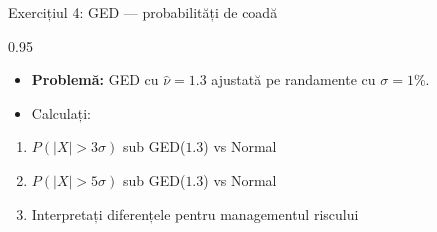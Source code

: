 \documentclass[9pt, aspectratio=169, t]{beamer}
\begin{document}
\begin{frame}{Exercițiul 4: GED --- probabilități de coadă}
    \begin{cminipage}{0.95\textwidth}
    \begin{itemize}\setlength{\itemsep}{0pt}
        \item \textbf{Problemă:} GED cu $\hat{\nu} = 1.3$ ajustată pe randamente cu $\sigma = 1\%$.
        \item Calculați:
    \end{itemize}
    \begin{enumerate}\setlength{\itemsep}{0pt}
        \item $P(|X| > 3\sigma)$ sub GED($1.3$) vs Normal
        \item $P(|X| > 5\sigma)$ sub GED($1.3$) vs Normal
        \item Interpretați diferențele pentru managementul riscului
    \end{enumerate}
    \end{cminipage}
\end{frame}
\end{document}
